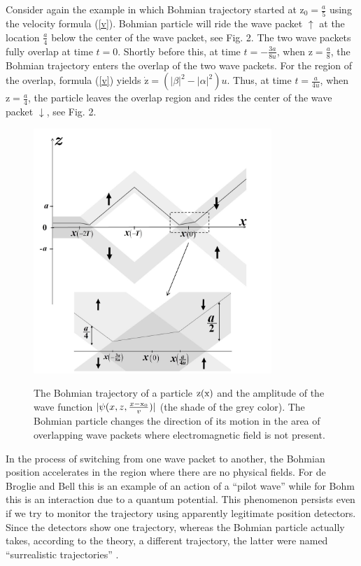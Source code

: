 \documentclass[preprint,tightenlines]{elsarticle}
\begin{document}
 Consider again the example  in which Bohmian trajectory started
at $\mathrm{z}_{0}=\frac{a}{5}$ using the velocity formula (\ref{v}). Bohmian
particle will ride the wave packet $\uparrow$ at the location $\frac{a}{4}$
below the center of the wave packet, see Fig. 2. The two wave packets fully overlap
at time $t=0$. Shortly before this, at time $t=-\frac{3a}{8u}$,
when $\mathrm{z}=\frac{a}{8}$, the Bohmian trajectory enters the overlap
of the two wave packets. For the region of the overlap, formula (\ref{v})
yields $\dot{\mathrm{z}}=(|\beta|^{2}-|\alpha|^{2})u$. Thus, at time
$t=\frac{a}{4u}$, when $\mathrm{z}=\frac{a}{4}$, the particle leaves the
overlap region and rides the center of the wave packet $\downarrow$, see Fig. 2.
\vspace {-12pt}
\begin{figure}[H]
  \includegraphics[width=9cm]{2.pdf}\\
  \vspace {-18pt}
       \caption{ The Bohmian trajectory of a particle $\rm z(x)$ and the amplitude of the wave function $|\psi(x,z,\frac{x-{\rm x}_0}{v})|$ (the shade of the grey color). The Bohmian particle changes the direction of its motion in the area of overlapping wave packets where electromagnetic field is not present.}
\end{figure}



In the process of switching from one wave packet to another, the Bohmian
position accelerates in the region where there are no physical fields.
For de Broglie and Bell this is an example of an action of
a ``pilot wave'' while for Bohm this is an interaction due to
a quantum potential. This phenomenon persists even if we
try to monitor the trajectory using apparently legitimate position
detectors. Since the detectors show one trajectory, whereas
the Bohmian particle actually takes, according to the theory, a different
trajectory, the latter were named ``surrealistic trajectories''
\cite{englert1992surrealistic}.
\end{document}
